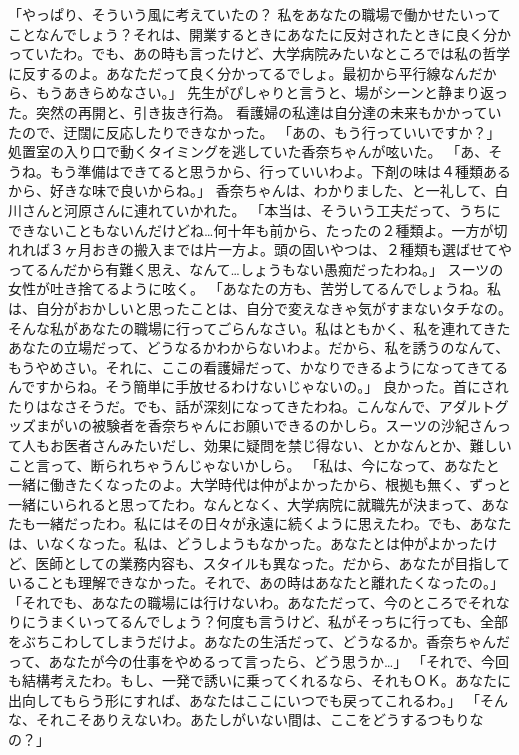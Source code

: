 「やっぱり、そういう風に考えていたの？ 私をあなたの職場で働かせたいってことなんでしょう？それは、開業するときにあなたに反対されたときに良く分かっていたわ。でも、あの時も言ったけど、大学病院みたいなところでは私の哲学に反するのよ。あなただって良く分かってるでしょ。最初から平行線なんだから、もうあきらめなさい。」
先生がぴしゃりと言うと、場がシーンと静まり返った。突然の再開と、引き抜き行為。
看護婦の私達は自分達の未来もかかっていたので、迂闊に反応したりできなかった。
「あの、もう行っていいですか？」
処置室の入り口で動くタイミングを逃していた香奈ちゃんが呟いた。
「あ、そうね。もう準備はできてると思うから、行っていいわよ。下剤の味は４種類あるから、好きな味で良いからね。」
香奈ちゃんは、わかりました、と一礼して、白川さんと河原さんに連れていかれた。
「本当は、そういう工夫だって、うちにできないこともないんだけどね…何十年も前から、たったの２種類よ。一方が切れれば３ヶ月おきの搬入までは片一方よ。頭の固いやつは、２種類も選ばせてやってるんだから有難く思え、なんて…しょうもない愚痴だったわね。」
スーツの女性が吐き捨てるように呟く。
「あなたの方も、苦労してるんでしょうね。私は、自分がおかしいと思ったことは、自分で変えなきゃ気がすまないタチなの。そんな私があなたの職場に行ってごらんなさい。私はともかく、私を連れてきたあなたの立場だって、どうなるかわからないわよ。だから、私を誘うのなんて、もうやめさい。それに、ここの看護婦だって、かなりできるようになってきてるんですからね。そう簡単に手放せるわけないじゃないの。」
良かった。首にされたりはなさそうだ。でも、話が深刻になってきたわね。こんなんで、アダルトグッズまがいの被験者を香奈ちゃんにお願いできるのかしら。スーツの沙紀さんって人もお医者さんみたいだし、効果に疑問を禁じ得ない、とかなんとか、難しいこと言って、断られちゃうんじゃないかしら。
「私は、今になって、あなたと一緒に働きたくなったのよ。大学時代は仲がよかったから、根拠も無く、ずっと一緒にいられると思ってたわ。なんとなく、大学病院に就職先が決まって、あなたも一緒だったわ。私にはその日々が永遠に続くように思えたわ。でも、あなたは、いなくなった。私は、どうしようもなかった。あなたとは仲がよかったけど、医師としての業務内容も、スタイルも異なった。だから、あなたが目指していることも理解できなかった。それで、あの時はあなたと離れたくなったの。」
「それでも、あなたの職場には行けないわ。あなただって、今のところでそれなりにうまくいってるんでしょう？何度も言うけど、私がそっちに行っても、全部をぶちこわしてしまうだけよ。あなたの生活だって、どうなるか。香奈ちゃんだって、あなたが今の仕事をやめるって言ったら、どう思うか…」
「それで、今回も結構考えたわ。もし、一発で誘いに乗ってくれるなら、それもＯＫ。あなたに出向してもらう形にすれば、あなたはここにいつでも戻ってこれるわ。」
「そんな、それこそありえないわ。あたしがいない間は、ここをどうするつもりなの？」

